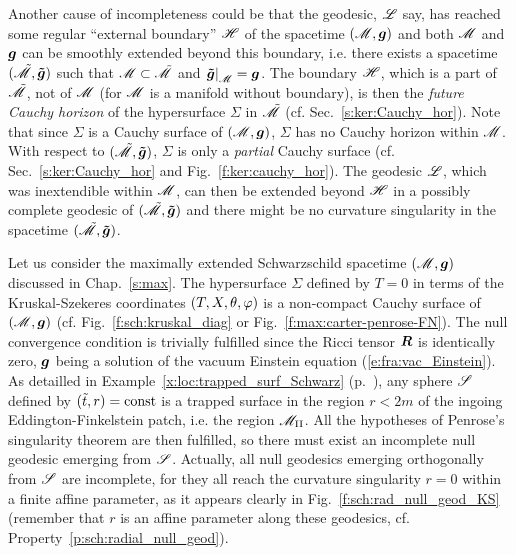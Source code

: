 Another cause of incompleteness could be
that the geodesic, $\mathscr{L}$ say, has reached some regular ``external boundary'' $\mathscr{H}$
of the spacetime $(\mathscr{M},\bm{g})$
and both $\mathscr{M}$ and $\bm{g}$ can be smoothly extended beyond this boundary, i.e.
there exists a spacetime $(\tilde{\mathscr{M}}, \bm{\tilde{g}})$ such that $\mathscr{M} \subset \tilde{\mathscr{M}}$
and $\left. \bm{\tilde{g}} \right| _{\mathscr{M}} = \bm{g}$. The boundary $\mathscr{H}$, which is a part of
$\tilde{\mathscr{M}}$, not of $\mathscr{M}$ (for $\mathscr{M}$ is a manifold without boundary), is then the
\emph{future Cauchy horizon}  of the hypersurface $\Sigma$
in $\tilde{\mathscr{M}}$ (cf. Sec.~\ref{s:ker:Cauchy_hor}).
Note that since $\Sigma$ is a Cauchy surface of $(\mathscr{M},\bm{g})$,
$\Sigma$ has no Cauchy horizon within $\mathscr{M}$. With respect to $(\tilde{\mathscr{M}}, \bm{\tilde{g}})$,
$\Sigma$ is only a \emph{partial} Cauchy surface (cf. Sec.~\ref{s:ker:Cauchy_hor}
and Fig.~\ref{f:ker:cauchy_hor}).
The geodesic $\mathscr{L}$, which was inextendible within $\mathscr{M}$, can then be extended beyond
$\mathscr{H}$ in a possibly complete geodesic of $(\tilde{\mathscr{M}},\bm{\tilde{g}})$ and
there might be no curvature singularity in the spacetime $(\tilde{\mathscr{M}},\bm{\tilde{g}})$.

\begin{example}
Let us consider the maximally extended Schwarzschild spacetime $(\mathscr{M},\bm{g})$
discussed in Chap.~\ref{s:max}.
The hypersurface $\Sigma$ defined by $T=0$ in terms of the Kruskal-Szekeres coordinates
$(T,X,\theta,\varphi)$ is a non-compact Cauchy surface of $(\mathscr{M},\bm{g})$ (cf. Fig.~\ref{f:sch:kruskal_diag}
or Fig.~\ref{f:max:carter-penrose-FN}).
The null convergence condition
is trivially fulfilled since the Ricci tensor $\bm{R}$
is identically zero, $\bm{g}$ being a solution of the vacuum Einstein equation
(\ref{e:fra:vac_Einstein}). As detailled in Example~\ref{x:loc:trapped_surf_Schwarz}
(p.~\pageref{x:loc:trapped_surf_Schwarz}), any sphere $\mathscr{S}$ defined
by $({\tilde t},r) = \mathrm{const}$ is a trapped surface in the region $r<2 m$
of the ingoing Eddington-Finkelstein patch, i.e. the region $\mathscr{M}_{\rm II}$.
All the hypotheses of Penrose's singularity theorem are then fulfilled,
so there must exist an incomplete null geodesic emerging from $\mathscr{S}$.
Actually, all null geodesics emerging orthogonally from $\mathscr{S}$ are incomplete,
for they all reach the curvature singularity $r=0$ within a finite affine
parameter, as it appears clearly in Fig.~\ref{f:sch:rad_null_geod_KS}
(remember that $r$ is an affine parameter along these geodesics, cf.
Property~\ref{p:sch:radial_null_geod}).
\end{example}

